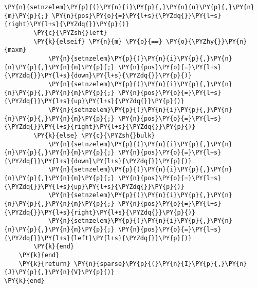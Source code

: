 \begin{Verbatim}[commandchars=\\\{\}]
            \PY{n}{setnzelem}\PY{p}{(}\PY{n}{i}\PY{p}{,}\PY{n}{n}\PY{p}{,}\PY{n}{m}\PY{p}{;} \PY{n}{pos}\PY{o}{=}\PY{l+s}{\PYZdq{}}\PY{l+s}{right}\PY{l+s}{\PYZdq{}}\PY{p}{)}
        \PY{c}{\PYZsh{}left}
        \PY{k}{elseif} \PY{n}{m} \PY{o}{==} \PY{o}{\PYZhy{}}\PY{n}{maxm}
            \PY{n}{setnzelem}\PY{p}{(}\PY{n}{i}\PY{p}{,}\PY{n}{n}\PY{p}{,}\PY{n}{m}\PY{p}{;} \PY{n}{pos}\PY{o}{=}\PY{l+s}{\PYZdq{}}\PY{l+s}{down}\PY{l+s}{\PYZdq{}}\PY{p}{)}
            \PY{n}{setnzelem}\PY{p}{(}\PY{n}{i}\PY{p}{,}\PY{n}{n}\PY{p}{,}\PY{n}{m}\PY{p}{;} \PY{n}{pos}\PY{o}{=}\PY{l+s}{\PYZdq{}}\PY{l+s}{up}\PY{l+s}{\PYZdq{}}\PY{p}{)}
            \PY{n}{setnzelem}\PY{p}{(}\PY{n}{i}\PY{p}{,}\PY{n}{n}\PY{p}{,}\PY{n}{m}\PY{p}{;} \PY{n}{pos}\PY{o}{=}\PY{l+s}{\PYZdq{}}\PY{l+s}{right}\PY{l+s}{\PYZdq{}}\PY{p}{)}
        \PY{k}{else} \PY{c}{\PYZsh{}bulk}
            \PY{n}{setnzelem}\PY{p}{(}\PY{n}{i}\PY{p}{,}\PY{n}{n}\PY{p}{,}\PY{n}{m}\PY{p}{;} \PY{n}{pos}\PY{o}{=}\PY{l+s}{\PYZdq{}}\PY{l+s}{down}\PY{l+s}{\PYZdq{}}\PY{p}{)}
            \PY{n}{setnzelem}\PY{p}{(}\PY{n}{i}\PY{p}{,}\PY{n}{n}\PY{p}{,}\PY{n}{m}\PY{p}{;} \PY{n}{pos}\PY{o}{=}\PY{l+s}{\PYZdq{}}\PY{l+s}{up}\PY{l+s}{\PYZdq{}}\PY{p}{)}
            \PY{n}{setnzelem}\PY{p}{(}\PY{n}{i}\PY{p}{,}\PY{n}{n}\PY{p}{,}\PY{n}{m}\PY{p}{;} \PY{n}{pos}\PY{o}{=}\PY{l+s}{\PYZdq{}}\PY{l+s}{right}\PY{l+s}{\PYZdq{}}\PY{p}{)}
            \PY{n}{setnzelem}\PY{p}{(}\PY{n}{i}\PY{p}{,}\PY{n}{n}\PY{p}{,}\PY{n}{m}\PY{p}{;} \PY{n}{pos}\PY{o}{=}\PY{l+s}{\PYZdq{}}\PY{l+s}{left}\PY{l+s}{\PYZdq{}}\PY{p}{)}
        \PY{k}{end}
    \PY{k}{end}
    \PY{k}{return} \PY{n}{sparse}\PY{p}{(}\PY{n}{I}\PY{p}{,}\PY{n}{J}\PY{p}{,}\PY{n}{V}\PY{p}{)}
\PY{k}{end}


\end{Verbatim}
